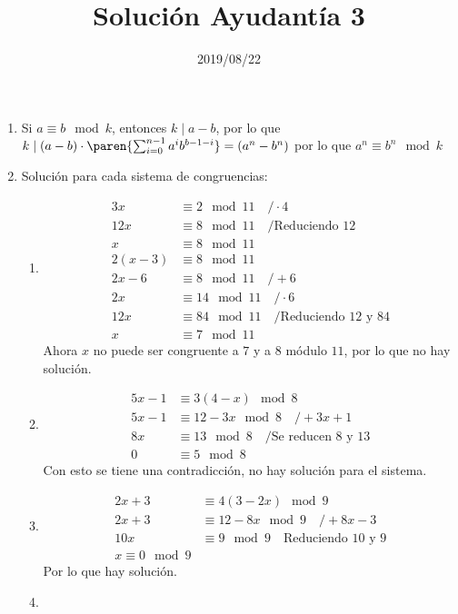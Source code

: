 \documentclass{ayudantia}
\title{Solución Ayudantía 3}
\date{2019/08/22}
\begin{document}
\maketitle
\begin{enumerate}
    \item Si \(a\equiv b\mod k\), entonces \(k\mid a-b\), por lo que \(k\mid (a-b)\cdot\paren{\sum_{i=0}^{n-1}a^ib^{b-1-i}}=(a^n-b^n)\) por lo que \(a^n\equiv b^n\mod k\)
    \item Solución para cada sistema de congruencias:
    \begin{enumerate}
        \item \begin{align*}
            3x&\equiv 2\mod 11 \quad/\cdot 4\\
            12x&\equiv 8\mod 11 \quad/\text{Reduciendo \(12\)}\\
            x&\equiv 8\mod 11\\
            2(x-3)&\equiv 8\mod 11\\
            2x-6&\equiv 8\mod 11 \quad/+6\\
            2x&\equiv 14\mod 11 \quad/\cdot6\\
            12x&\equiv 84\mod 11 \quad/\text{Reduciendo \(12\) y \(84\)}\\
            x&\equiv 7\mod 11
        \end{align*}
        Ahora \(x\) no puede ser congruente a \(7\) y a \(8\) módulo \(11\), por lo que no hay solución.
        \item \begin{align*}
            5x-1&\equiv 3(4-x)\mod 8\\
            5x-1&\equiv 12-3x\mod 8\quad/+3x+1\\
            8x&\equiv 13\mod 8\quad/\text{Se reducen \(8\) y \(13\)}\\
            0&\equiv 5\mod 8
        \end{align*}
        Con esto se tiene una contradicción, no hay solución para el sistema.
        \item \begin{align*}
            2x+3&\equiv 4(3-2x)\mod 9\\
            2x+3&\equiv 12-8x\mod 9\quad/+8x-3\\
            10x&\equiv 9\mod 9\quad\text{Reduciendo \(10\) y \(9\)}\\
            x\equiv 0\mod 9
        \end{align*}
        Por lo que hay solución.
        \item \begin{align*}

\end{align*}
\end{enumerate}
\end{enumerate}
\end{document}
